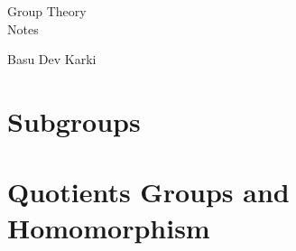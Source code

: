 \documentclass[12pt]{article}
\theoremstyle{definition}
\theoremstyle{plain}
\theoremstyle{definition}
\begin{document}
\begin{titlepage}
    \centering
    \vspace*{4cm} %

    {\Huge Group Theory\\[0.5em]
    \huge Notes\\[1em]}
    
    {\LARGE Basu Dev Karki\par}
\end{titlepage}

{
    \thispagestyle{plain}
    \tableofcontents
}

\eject
\section{Subgroups}

\eject

\eject

\eject


\eject
\section{Quotients Groups and Homomorphism}

\end{document}
